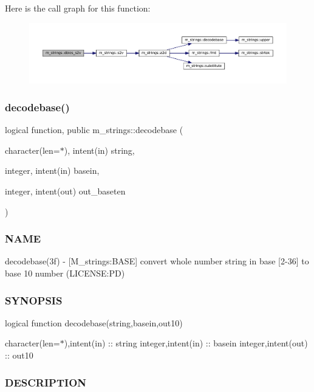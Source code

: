 Here is the call graph for this function\+:\nopagebreak
\begin{figure}[H]
\begin{center}
\leavevmode
\includegraphics[width=350pt]{namespacem__strings_ab463f9b431dd817b7b509608ec823b0f_cgraph}
\end{center}
\end{figure}
\mbox{\label{namespacem__strings_a3883dae1b85c2d4a09d2d7e46ff422ab}} 
\subsubsection{\texorpdfstring{decodebase()}{decodebase()}}
{\footnotesize\ttfamily logical function, public m\+\_\+strings\+::decodebase (\begin{DoxyParamCaption}\item[{character(len=$\ast$), intent(in)}]{string,  }\item[{integer, intent(in)}]{basein,  }\item[{integer, intent(out)}]{out\+\_\+baseten }\end{DoxyParamCaption})}



\subsubsection*{N\+A\+ME}

decodebase(3f) -\/ \mbox{[}M\+\_\+strings\+:B\+A\+SE\mbox{]} convert whole number string in base \mbox{[}2-\/36\mbox{]} to base 10 number (L\+I\+C\+E\+N\+SE\+:PD)

\subsubsection*{S\+Y\+N\+O\+P\+S\+IS}

logical function decodebase(string,basein,out10)

character(len=$\ast$),intent(in) \+:\+: string integer,intent(in) \+:\+: basein integer,intent(out) \+:\+: out10 \subsubsection*{D\+E\+S\+C\+R\+I\+P\+T\+I\+ON}

